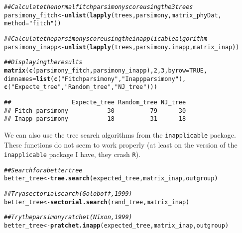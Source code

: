 \documentclass{article}\usepackage[]{graphicx}\usepackage[]{color}
\makeatletter
\newcommand{\hlnum}[1]{\textcolor[rgb]{0.686,0.059,0.569}{#1}}%
\newcommand{\hlstr}[1]{\textcolor[rgb]{0.192,0.494,0.8}{#1}}%
\newcommand{\hlcom}[1]{\textcolor[rgb]{0.678,0.584,0.686}{\textit{#1}}}%
\newcommand{\hlstd}[1]{\textcolor[rgb]{0.345,0.345,0.345}{#1}}%
\newcommand{\hlkwb}[1]{\textcolor[rgb]{0.69,0.353,0.396}{#1}}%
\newcommand{\hlkwc}[1]{\textcolor[rgb]{0.333,0.667,0.333}{#1}}%
\newcommand{\hlkwd}[1]{\textcolor[rgb]{0.737,0.353,0.396}{\textbf{#1}}}%
\newenvironment{kframe}{%
 \def\at@end@of@kframe{}%
 \ifinner\ifhmode%
  \def\at@end@of@kframe{\end{minipage}}%
  \begin{minipage}{\columnwidth}%
 \fi\fi%
 \def\FrameCommand##1{\hskip\@totalleftmargin \hskip-\fboxsep
 \colorbox{shadecolor}{##1}\hskip-\fboxsep
     \hskip-\linewidth \hskip-\@totalleftmargin \hskip\columnwidth}%
 \MakeFramed {\advance\hsize-\width
   \@totalleftmargin\z@ \linewidth\hsize
   \@setminipage}}%
 {\par\unskip\endMakeFramed%
 \at@end@of@kframe}
\newenvironment{knitrout}{}{} %
\makeatother
\begin{document}
\begin{knitrout}
\color{fgcolor}\begin{kframe}
\begin{alltt}
\hlcom{## Calculate the normal fitch parsimony score using the 3 trees}
\hlstd{parsimony_fitch} \hlkwb{<-} \hlkwd{unlist}\hlstd{(}\hlkwd{lapply}\hlstd{(trees, parsimony, matrix_phyDat,}
    \hlkwc{method} \hlstd{=} \hlstr{"fitch"}\hlstd{))}

\hlcom{## Calculate the parsimony score using the inapplicable algorithm}
\hlstd{parsimony_inapp} \hlkwb{<-} \hlkwd{unlist}\hlstd{(}\hlkwd{lapply}\hlstd{(trees, parsimony.inapp, matrix_inap))}

\hlcom{## Displaying the results}
\hlkwd{matrix}\hlstd{(}\hlkwd{c}\hlstd{(parsimony_fitch, parsimony_inapp),} \hlnum{2}\hlstd{,} \hlnum{3}\hlstd{,} \hlkwc{byrow} \hlstd{=} \hlnum{TRUE}\hlstd{,}
    \hlkwc{dimnames} \hlstd{=} \hlkwd{list}\hlstd{(}\hlkwd{c}\hlstd{(}\hlstr{"Fitch parsimony"}\hlstd{,} \hlstr{"Inapp parsimony"}\hlstd{),}
    \hlkwd{c}\hlstd{(}\hlstr{"Expecte_tree"}\hlstd{,} \hlstr{"Random_tree"}\hlstd{,} \hlstr{"NJ_tree"}\hlstd{)))}
\end{alltt}
\begin{verbatim}
##                 Expecte_tree Random_tree NJ_tree
## Fitch parsimony           30          79      30
## Inapp parsimony           18          31      18
\end{verbatim}
\end{kframe}
\end{knitrout}

We can also use the tree search algorithms from the \texttt{inapplicable} package.
These functions do not seem to work properly (at least on the version of the \texttt{inapplicable} package I have, they crash \texttt{R}).

\begin{knitrout}
\color{fgcolor}\begin{kframe}
\begin{alltt}
\hlcom{## Search for a better tree}
\hlstd{better_tree} \hlkwb{<-} \hlkwd{tree.search}\hlstd{(expected_tree, matrix_inap, outgroup)}

\hlcom{## Try a sectorial search (Goloboff, 1999)}
\hlstd{better_tree} \hlkwb{<-} \hlkwd{sectorial.search}\hlstd{(rand_tree, matrix_inap)}

\hlcom{## Try the parsimony ratchet (Nixon, 1999)}
\hlstd{better_tree} \hlkwb{<-} \hlkwd{pratchet.inapp}\hlstd{(expected_tree, matrix_inap, outgroup)}
\end{alltt}
\end{kframe}
\end{knitrout}
\end{document}

